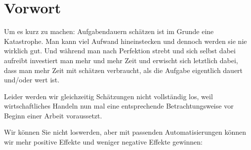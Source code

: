 \hypertarget{foreword}{%
\section{Vorwort}\label{foreword}}

Um es kurz zu machen: Aufgabendauern schätzen ist im Grunde eine Katastrophe. Man kann viel Aufwand hineinstecken und dennoch werden sie nie wirklich gut. Und während man nach Perfektion strebt und sich selbst dabei aufreibt investiert man mehr und mehr Zeit und erwischt sich letztlich dabei, dass man mehr Zeit mit schätzen verbraucht, als die Aufgabe eigentlich dauert und/oder wert ist.

Leider werden wir gleichzeitig Schätzungen nicht vollständig los, weil wirtschaftliches Handeln nun mal eine entsprechende Betrachtungsweise vor Beginn einer Arbeit voraussetzt. 

Wir können Sie nicht loswerden, aber mit passenden Automatisierungen können wir mehr positive Effekte und weniger negative Effekte gewinnen:

